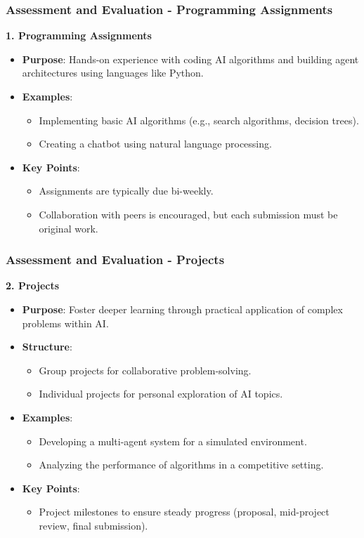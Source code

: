 \documentclass[aspectratio=169]{beamer}
\begin{document}
\begin{frame}[fragile]
    \frametitle{Assessment and Evaluation - Programming Assignments}
    \textbf{1. Programming Assignments}
    
    \begin{itemize}
        \item \textbf{Purpose}: Hands-on experience with coding AI algorithms and building agent architectures using languages like Python.
        \item \textbf{Examples}:
        \begin{itemize}
            \item Implementing basic AI algorithms (e.g., search algorithms, decision trees).
            \item Creating a chatbot using natural language processing.
        \end{itemize}
        \item \textbf{Key Points}:
        \begin{itemize}
            \item Assignments are typically due bi-weekly.
            \item Collaboration with peers is encouraged, but each submission must be original work.
        \end{itemize}
    \end{itemize}
\end{frame}

\begin{frame}[fragile]
    \frametitle{Assessment and Evaluation - Projects}
    \textbf{2. Projects}
    
    \begin{itemize}
        \item \textbf{Purpose}: Foster deeper learning through practical application of complex problems within AI.
        \item \textbf{Structure}:
        \begin{itemize}
            \item Group projects for collaborative problem-solving.
            \item Individual projects for personal exploration of AI topics.
        \end{itemize}
        \item \textbf{Examples}:
        \begin{itemize}
            \item Developing a multi-agent system for a simulated environment.
            \item Analyzing the performance of algorithms in a competitive setting.
        \end{itemize}
        \item \textbf{Key Points}:
        \begin{itemize}
            \item Project milestones to ensure steady progress (proposal, mid-project review, final submission).
        \end{itemize}
    \end{itemize}
\end{frame}
\end{document}
